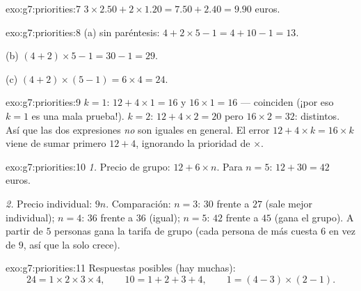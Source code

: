 \begin{solution}{exo:g7:priorities:7}
$3 \times 2.50 + 2 \times 1.20 = 7.50 + 2.40 = 9.90$ euros.
\end{solution}

\begin{solution}{exo:g7:priorities:8}
(a) sin paréntesis: $4 + 2 \times 5 - 1 = 4 + 10 - 1 = 13$.

(b) $(4 + 2) \times 5 - 1 = 30 - 1 = 29$.

(c) $(4 + 2) \times (5 - 1) = 6 \times 4 = 24$.
\end{solution}

\begin{solution}{exo:g7:priorities:9}
$k = 1$: $12 + 4 \times 1 = 16$ y $16 \times 1 = 16$ --- coinciden
(¡por eso $k = 1$ es una mala prueba!). $k = 2$:
$12 + 4 \times 2 = 20$ pero $16 \times 2 = 32$: distintos. Así que las dos
expresiones \emph{no} son iguales en general. El error
$12 + 4 \times k = 16 \times k$ viene de sumar primero $12 + 4$,
ignorando la prioridad de $\times$.
\end{solution}

\begin{solution}{exo:g7:priorities:10}
\emph{1.} Precio de grupo: $12 + 6 \times n$. Para $n = 5$:
$12 + 30 = 42$ euros.

\emph{2.} Precio individual: $9n$. Comparación: $n = 3$: $30$ frente a $27$
(sale mejor individual); $n = 4$: $36$ frente a $36$ (igual); $n = 5$: $42$ frente a
$45$ (gana el grupo). A partir de $5$ personas gana la tarifa de grupo
(cada persona de más cuesta $6$ en vez de $9$, así que la  solo crece).
\end{solution}

\begin{solution}{exo:g7:priorities:11}
Respuestas posibles (hay muchas):
\[
24 = 1 \times 2 \times 3 \times 4, \qquad
10 = 1 + 2 + 3 + 4, \qquad
1 = (4 - 3) \times (2 - 1).
\]
\end{solution}

